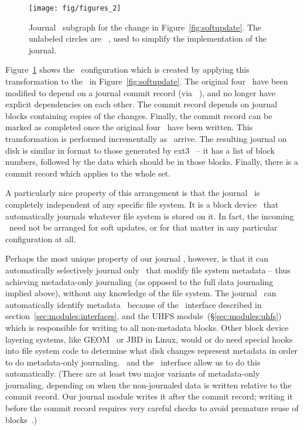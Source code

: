 \begin{figure}
  \centering
  \texttt{[image: fig/figures\_2]}
  \caption{\label{fig:journal} Journal \chdesc\ subgraph for the
    change in Figure~\ref{fig:softupdate}. The unlabeled circles are
    \noop\ \chdescs, used to simplify the implementation of the journal.}
\end{figure}

Figure~\ref{fig:journal} shows the \chdesc\ configuration which is created by
applying this transformation to the \chdescs\ in Figure~\ref{fig:softupdate}.
The original four \chdescs\ have been modified to depend on a journal commit
record (via \anoop\ \chdesc), and no longer have explicit dependencies on each
other. The commit record depends on journal blocks containing copies of the
changes. Finally, the commit record can be marked as completed once the
original four \chdescs\ have been written. This transformation is performed
incrementally as \chdescs\ arrive. The resulting journal on disk is similar in
format to those generated by ext3~\cite{tweedie98journaling} -- it has a list of
block numbers, followed by the data which should be in those blocks. Finally,
there is a commit record which applies to the whole set.

A particularly nice property of this arrangement is that the journal \module\ is
completely independent of any specific file system. It is a block device
\module\ that automatically journals whatever file system is stored on it. In
fact, the incoming \chdescs\ need not be arranged for soft updates, or for that
matter in any particular configuration at all.

Perhaps the most unique property of our journal \module, however, is that it can
automatically selectively journal only \chdescs\ that modify file system
metadata -- thus achieving metadata-only journaling (as opposed to the full data
journaling implied above), without any knowledge of the file system.
%
The journal \module\ can automatically identify metadata \chdescs\ because of
the \LFS\ interface described in section~\ref{sec:modules:interfaces}, and the
UHFS module~(\S\ref{sec:modules:uhfs}) which is responsible for writing to all
non-metadata blocks. Other block device layering systems, like GEOM~\cite{geom}
or JBD in Linux, would or do need special hooks into file system code to
determine what disk changes represent metadata in order to do metadata-only
journaling. \Chdescs\ and the \LFS\ interface allow us to do this automatically.
%
(There are at least two major variants of metadata-only journaling, depending on
when the non-journaled data is written relative to the commit record. Our
journal module writes it after the commit record; writing it before the commit
record requires very careful checks to avoid premature reuse of
blocks~\cite{tweedie00ext3}.)

